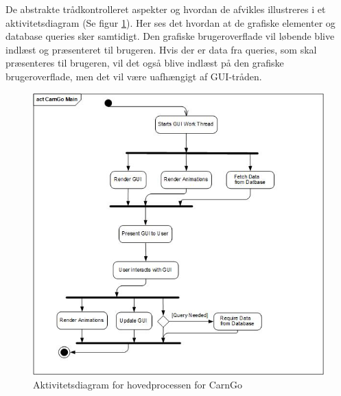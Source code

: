 \documentclass[Arkitektur/System_main.tex]{subfiles}
\begin{document}
\noindent De abstrakte trådkontrolleret aspekter og hvordan de afvikles illustreres i et aktivitetsdiagram (Se figur \ref{fig:activity}). Her ses det hvordan at de grafiske elementer og database queries sker samtidigt. Den grafiske brugeroverflade vil løbende blive indlæst og præsenteret til brugeren. Hvis der er data fra queries, som skal præsenteres til brugeren, vil det også blive indlæst på den grafiske brugeroverflade, men det vil være uafhængigt af GUI-tråden.
\begin{figure}[H]
    \centering
    \includegraphics[width=1\textwidth]{Arkitektur/4+1View/Graphics/ActivityDiagram_Process.jpg}
    \caption{Aktivitetsdiagram for hovedprocessen for CarnGo}
    \label{fig:activity}
\end{figure}
\end{document}
